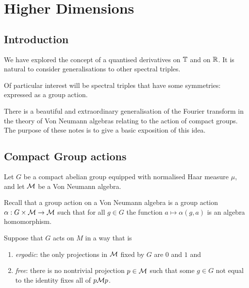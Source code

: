 
\chapter{Higher Dimensions} %

\label{HigherDimensions} %


\section{Introduction}
We have explored the concept of a quantised derivatives on $\mathbb{T}$ and on $\mathbb{R}$.
It is natural to consider generalisations to other spectral triples. 

Of particular interest will be spectral triples that have some symmetries: expressed
as a group action. 

There is a beautiful and extraordinary generalisation of the Fourier
transform in the theory of Von Neumann algebras relating
to the action of compact groups. The purpose
of these notes is to give a basic exposition of this idea.

\section{Compact Group actions}
Let $G$ be a compact abelian group equipped with normalised Haar
measure $\mu$, and let $\mathcal{M}$ be a Von Neumann algebra.

Recall that a group action on a Von Neumann algebra
is a group action $\alpha:G\times \mathcal{M}\rightarrow \mathcal{M}$ such that
for all $g \in G$ the function $a\mapsto \alpha(g,a)$ is an algebra
homomorphism.

Suppose that $G$ acts on $M$ in a way that is
\begin{enumerate}
    \item{} \emph{ergodic}: the only projections in $\mathcal{M}$
    fixed by $G$ are $0$ and $1$ and
    \item{} \emph{free}: there is no nontrivial projection $p \in \mathcal{M}$
    such that some $g \in G$ not equal to the identity fixes all of $p\mathcal{M} p$.
\end{enumerate}

